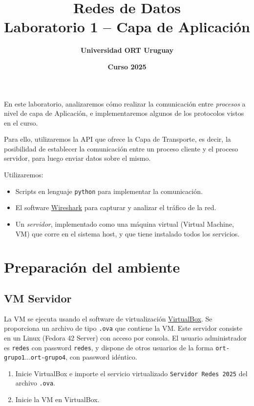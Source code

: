 \documentclass[a4paper,10pt]{article}
\title{\bf Redes de Datos\\Laboratorio 1 -- Capa de Aplicación}
\author{\bf Universidad ORT Uruguay}
\date{\bf Curso 2025}
\begin{document}
\maketitle
\thispagestyle{fancy}

En este laboratorio, analizaremos cómo realizar la comunicación entre \emph{procesos} a nivel de capa de Aplicación, e implementaremos algunos de los protocolos vistos en el curso. 

Para ello, utilizaremos la API que ofrece la Capa de Transporte, es decir, la posibilidad de establecer la comunicación entre un proceso cliente y el proceso servidor, para luego enviar datos sobre el mismo.

Utilizaremos:
\begin{itemize}
    \item Scripts en lenguaje \texttt{python} para implementar la comunicación.
    \item El software \href{http://wireshark.org}{Wireshark} para capturar y analizar el tráfico de la red.
    \item Un \emph{servidor}, implementado como una máquina virtual (Virtual Machine, VM) que corre en el sistema host, y que tiene instalado todos los servicios. 
\end{itemize}

\section*{Preparación del ambiente}

\subsection*{VM Servidor}

La VM se ejecuta usando el software de virtualización \href{https://www.virtualbox.org/}{VirtualBox}. Se proporciona un archivo de tipo \texttt{.ova} que contiene la VM. Este servidor consiste en un Linux (Fedora 42 Server) con acceso por consola. El usuario administrador es \texttt{redes} con password \texttt{redes}, y dispone de otros usuarios de la forma \texttt{ort-grupo1}$\ldots$\texttt{ort-grupo4}, con password idéntico.

\begin{enumerate}
    \item Inicie VirtualBox e importe el servicio virtualizado \texttt{Servidor Redes 2025} del archivo \texttt{.ova}.
    \item Inicie la VM en VirtualBox.
\end{enumerate}
\end{document}
